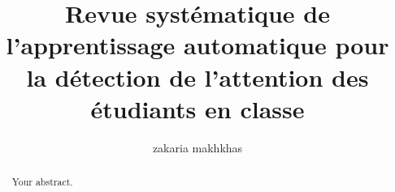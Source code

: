 \documentclass{article}
\title{Revue systématique de l'apprentissage automatique pour la détection de l'attention des étudiants en classe}
\author{zakaria makhkhas}
\begin{document}
\maketitle

\begin{abstract}
Your abstract.
\end{abstract}










\end{document}
